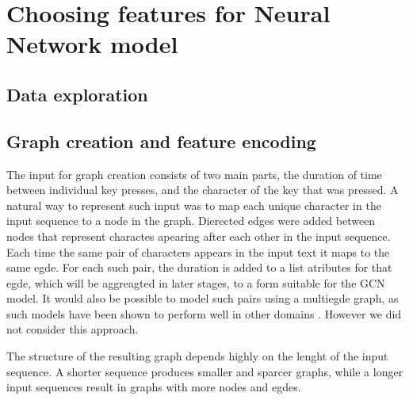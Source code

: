 
\section{Choosing features for Neural Network model}


\subsection{Data exploration}

\subsection{Graph creation and feature encoding}
The input for graph creation consists of two main parts, the duration of time between individual key presses, and the character of the key that was pressed.
A natural way to represent such input was to map each unique character in the input sequence to a node in the graph. 
Dierected edges were added between nodes that represent charactes apearing after each other in the input sequence. 
Each time the same pair of characters appears in the input text it maps to the same egde. For each such pair, the duration is added to a list atributes for that egde, which will be aggreagted in later stages, to a form suitable for the GCN model. It would also be possible to model such pairs using a multiegde graph, as such models have been shown to perform well in other domains . However we did not consider this approach. 

The structure of the resulting graph depends highly on the lenght of the input sequence. A shorter sequence produces smaller and sparcer graphs, while a longer input sequences result in graphs with more nodes and egdes. 

\\

